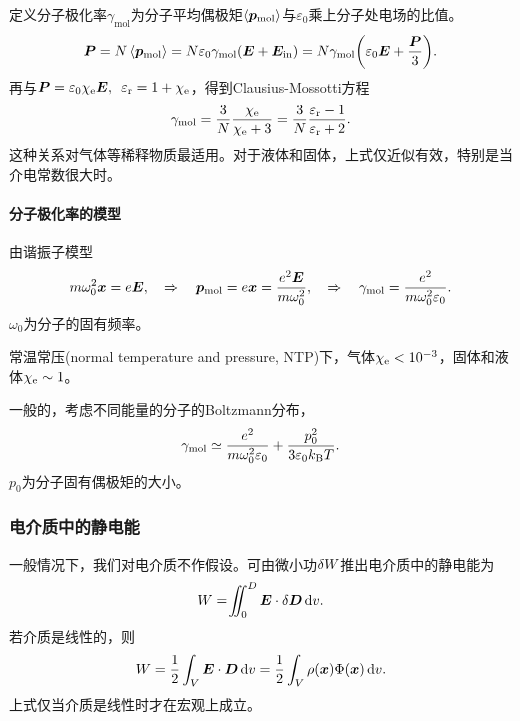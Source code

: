 定义分子极化率$\gamma_\text{mol}$为分子平均偶极矩$\left\langle \bm p_\text{mol}\right\rangle$与$\varepsilon_0$乘上分子处电场的比值。
\[
    \bm P=N\left\langle \bm p_\text{mol}\right\rangle=N\varepsilon_0\gamma_\text{mol}(\bm E+\bm E_\text{in})=N\gamma_\text{mol}\biggl(\varepsilon_0\bm E+\frac{\bm P}3\biggr).
\]
再与$\bm P=\varepsilon_0\chi_\mathrm e\bm E,\enspace\varepsilon_\text r=1+\chi_\mathrm e$，得到Clausius-Mossotti方程
\begin{equation}
    \gamma_\text{mol}=\frac3N\frac{\chi_\mathrm e}{\chi_\mathrm e+3}=\frac3N\frac{\varepsilon_\text r-1}{\varepsilon_\text r+2}.
\end{equation}
这种关系对气体等稀释物质最适用。对于液体和固体，上式仅近似有效，特别是当介电常数很大时。
\paragraph{分子极化率的模型}
由谐振子模型
\[
    m\omega_0^2\bm x=e\bm E,\quad\Rightarrow\quad\bm p_\text{mol}=e\bm x=\frac{e^2\bm E}{m\omega_0^2},\quad\Rightarrow\quad\gamma_\text{mol}=\frac{e^2}{m\omega_0^2\varepsilon_0}.
\]
$\omega_0$为分子的固有频率。

常温常压(normal temperature and pressure, NTP)下，气体$\chi_\mathrm e<10^{-3}$，固体和液体$\chi_\mathrm e\sim 1$。

一般的，考虑不同能量的分子的Boltzmann分布，
\[
    \gamma_\text{mol}\simeq\frac{e^2}{m\omega_0^2\varepsilon_0}+\frac{p_0^2}{3\varepsilon_0k_{\mathrm B} T}.
\]
$p_0$为分子固有偶极矩的大小。
\subsubsection{电介质中的静电能}
一般情况下，我们对电介质不作假设。可由微小功$\mathop{}\!\delta W$推出电介质中的静电能为
\[
    W=\hspace{-2 pt}\int\hspace{-8 pt}\int_0^D\bm E\cdot\mathop{}\!\delta\bm D\mathop{}\!\mathrm{d} v.
\]
若介质是线性的，则
\begin{equation}
    W=\frac12\int_V\bm E\cdot\bm D\mathop{}\!\mathrm{d} v=\frac12\int_V\rho(\bm x)\Phi(\bm x)\mathop{}\!\mathrm{d} v.
\end{equation}
上式仅当介质是线性时才在宏观上成立。
